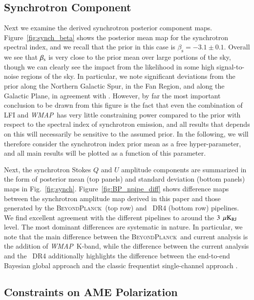 \documentclass[twocolumn]{aa}
\def\WMAP{\textit{WMAP}}
\newcommand{\BP}{\textsc{BeyondPlanck}}
\begin{document}
\subsection{Synchrotron Component}
\label{sec:synch}

Next we examine the derived synchrotron posterior component maps.
Figure~\ref{fig:synch_beta} shows the posterior mean map for the
synchrotron spectral index, and we recall that the prior in this case
is $\beta_{\mathrm{s}}=-3.1\pm0.1$. Overall we see that $\beta_{\rm
  s}$ is very close to the prior mean over large portions of the sky,
though we can clearly see the impact from the likelihood in some high
signal-to-noise regions of the sky. In particular, we note significant
deviations from the prior along the Northern Galactic Spur, in the Fan
Region, and along the Galactic Plane, in agreement with
\citet{bp14}. However, by far the most important conclusion to be
drawn from this figure is the fact that even the combination of LFI
and \WMAP\ has very little constraining power compared to the prior with respect to the
spectral index of synchrotron emission, and all results that depends
on this will necessarily be sensitive to the assumed prior. In the
following, we will therefore consider the synchrotron index prior mean
as a free hyper-parameter, and all main results will be plotted as a
function of this parameter.

Next, the synchrotron Stokes $Q$ and $U$ amplitude components are
summarized in the form of posterior mean (top panels) and standard
deviation (bottom panels) maps in
Fig.~\ref{fig:synch}. Figure~\ref{fig:BP_npipe_diff} shows difference
maps between the synchrotron amplitude map derived in this paper and
those generated by the \BP\ (top row) and \Planck\ DR4 (bottom row)
pipelines. We find excellent agreement with the different pipelines to around the $3~\muK_{\mathrm{RJ}}$ level. The most dominant differences are systematic in nature. In
particular, we note that the main difference between the \BP\ and
current analysis is the addition of \WMAP\ K-band, while the
difference between the current analysis and the \Planck\ DR4
additionally highlights the difference between the end-to-end Bayesian
global approach \citep{bp01} and the classic frequentist
single-channel approach \citep{npipe}.



\subsection{Constraints on AME Polarization}\label{sec:AME_constraints}
\end{document}
